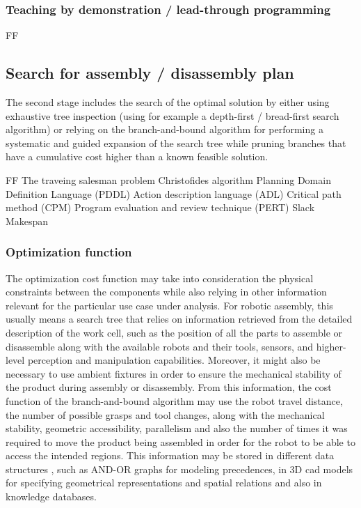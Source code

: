 

\subsubsection{Teaching by demonstration / lead-through programming}

FF\


\subsection{Search for assembly / disassembly plan}

The second stage includes the search of the optimal solution by either using exhaustive tree inspection (using for example a depth-first / bread-first search algorithm) or relying on the branch-and-bound algorithm \cite{Thomas2011,Thomas2015} for performing a systematic and guided expansion of the search tree while pruning branches that have a cumulative cost higher than a known feasible solution.

FF
The traveing salesman problem
	Christofides algorithm
Planning Domain Definition Language (PDDL)
Action description language (ADL)
Critical path method (CPM)
Program evaluation and review technique (PERT)
Slack
Makespan



\subsubsection{Optimization function}

The optimization cost function may take into consideration the physical constraints between the components while also relying in other information relevant for the particular use case under analysis. For robotic assembly, this usually means a search tree that relies on information retrieved from the detailed description of the work cell, such as the position of all the parts to assemble or disassemble along with the available robots and their tools, sensors, and higher-level perception and manipulation capabilities. Moreover, it might also be necessary to use ambient fixtures in order to ensure the mechanical stability of the product during assembly or disassembly. From this information, the cost function of the branch-and-bound algorithm may use the robot travel distance, the number of possible grasps and tool changes, along with the mechanical stability, geometric accessibility, parallelism and also the number of times it was required to move the product being assembled in order for the robot to be able to access the intended regions. This information may be stored in different data structures \cite{Thomas2001}, such as AND-OR graphs for modeling precedences, in 3D \gls{cad} models for specifying geometrical representations and spatial relations and also in knowledge databases.

